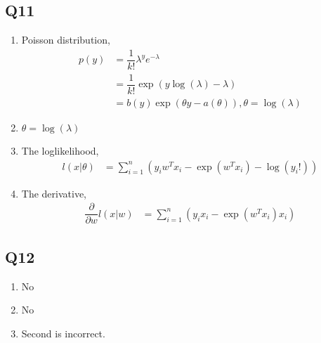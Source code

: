 \documentclass{article}
\begin{document}
\subsection{Q11}
\begin{enumerate}
\item Poisson distribution,
\begin{align*}
p\left(y\right)  &= \dfrac{1}{k!} \lambda^{y} e^{-\lambda}
\\ &= \dfrac{1}{k!} \exp\left(y \log\left(\lambda\right) - \lambda\right)
\\ &= b\left(y\right) \exp\left(\theta y - a\left(\theta\right)\right), \theta = \log\left(\lambda\right)
\end{align*}
\item $\theta = \log\left(\lambda\right)$
\end{enumerate}

\begin{enumerate}
\setcounter{enumii}{2}
\item The loglikelihood,
\begin{align*}
l\left(x | \theta\right)  &= \displaystyle\sum_{i=1}^{n} \left(y_{i} w^{T} x_{i} - \exp\left(w^{T} x_{i}\right) - \log\left(y_{i} !\right)\right)
\end{align*}
\item The derivative,
\begin{align*}
\dfrac{\partial }{\partial w} l\left(x | w\right) &= \displaystyle\sum_{i=1}^{n} \left(y_{i} x_{i} - \exp\left(w^{T} x_{i}\right) x_{i}\right)
\end{align*}
\end{enumerate}


\subsection{Q12}
\begin{enumerate}
\item No
\end{enumerate}

\begin{enumerate}
\setcounter{enumii}{1}
\item No
\end{enumerate}

\begin{enumerate}
\setcounter{enumii}{2}
\item Second is incorrect.
\end{enumerate}
\end{document}
